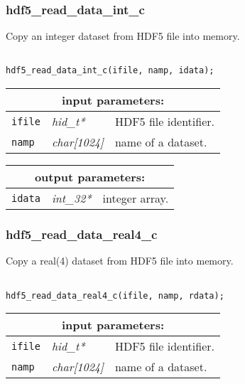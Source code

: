 \vskip 0.8cm

\subsubsection{hdf5\_read\_data\_int\_c}

Copy an integer dataset from HDF5 file into memory.

\begin{verbatim}

hdf5_read_data_int_c(ifile, namp, idata);
\end{verbatim}

\noindent
\begin{tabular}{|p{1.5cm}|p{2cm}|p{11cm}|}
\hline
\multicolumn{3}{|c|}{\bf input parameters:} \\
\hline
{\tt ifile} & {\it hid\_t*} & HDF5 file identifier. \\
\hline
{\tt namp} & {\it char[1024]} & name of a dataset. \\
\hline
\end{tabular}

\vskip 0.8cm

\noindent
\begin{tabular}{|p{1.5cm}|p{2cm}|p{11cm}|}
\hline
\multicolumn{3}{|c|}{\bf output parameters:} \\
\hline
{\tt idata} & {\it int\_32*} & integer array. \\
\hline
\end{tabular}

\subsubsection{hdf5\_read\_data\_real4\_c}

Copy a real(4) dataset from HDF5 file into memory.

\begin{verbatim}

hdf5_read_data_real4_c(ifile, namp, rdata);
\end{verbatim}

\noindent
\begin{tabular}{|p{1.5cm}|p{2cm}|p{11cm}|}
\hline
\multicolumn{3}{|c|}{\bf input parameters:} \\
\hline
{\tt ifile} & {\it hid\_t*} & HDF5 file identifier. \\
\hline
{\tt namp} & {\it char[1024]} & name of a dataset. \\
\hline
\end{tabular}

